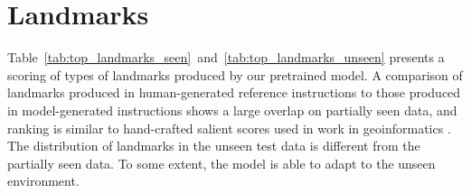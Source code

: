 \documentclass[11pt,a4paper]{article}
\begin{document}
\section{Landmarks}
Table~\ref{tab:top_landmarks_seen}~and~\ref{tab:top_landmarks_unseen} presents a scoring of types of landmarks produced by our pretrained model. A comparison of landmarks produced in human-generated reference instructions to those produced in model-generated instructions shows a large overlap on partially seen data, and ranking is similar to hand-crafted salient scores used in work in geoinformatics \citep{rousell-zipf-2017-towards}. The distribution of landmarks in the unseen test data is different from the partially seen data. To some extent, the model is able to adapt to the unseen environment.
\begin{table}
\end{table}
\end{document}
